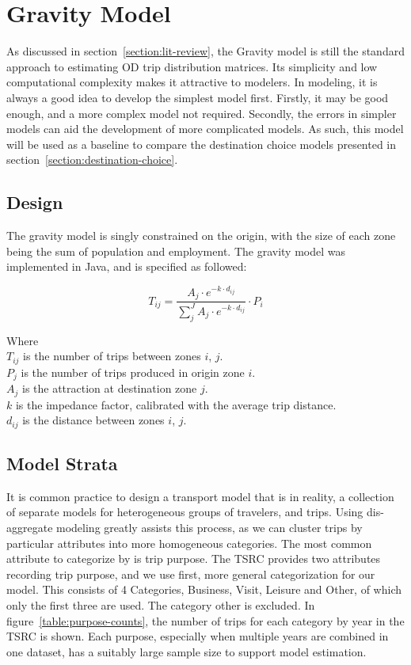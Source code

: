 \chapter{Gravity Model} 
\label{section:gravity-model}
As discussed in section~\ref{section:lit-review}, the Gravity model is still the standard approach to estimating OD trip distribution matrices. Its simplicity and low computational complexity makes it attractive to modelers. In modeling, it is always a good idea to develop the simplest model first. Firstly, it may be good enough, and a more complex model not required. Secondly, the errors in simpler models can aid the development of more complicated models. As such, this model will be used as a baseline to compare the destination choice models presented in section~\ref{section:destination-choice}.

\section{Design}
The gravity model is singly constrained on the origin, with the size of each zone being the sum of population and employment. The gravity model was implemented in Java, and is specified as followed:

$$ 
T_{ij} = \frac{A_j \cdot e^{-k \cdot d_{ij}}}{\sum_j^J A_j \cdot e^{-k \cdot d_{ij}}} \cdot P_i $$

Where \\
$T_{ij}$ is the number of trips between zones $i$, $j$. \\
$P_j$ is the number of trips produced in origin zone $i$.\\
$A_j$ is the attraction at destination zone $j$.\\
$k$ is the impedance factor, calibrated with the average trip distance.\\
$d_{ij}$ is the distance between zones $i$, $j$.\\

\section{Model Strata}
It is common practice to design a transport model that is in reality, a collection of separate models for heterogeneous groups of travelers, and trips. Using dis-aggregate modeling greatly assists this process, as we can cluster trips by particular attributes into more homogeneous categories. The most common attribute to categorize by is trip purpose. The TSRC provides two attributes recording trip purpose, and we use first, more general categorization for our model. This consists of 4 Categories, Business, Visit, Leisure and Other, of which only the first three are used. The category other is excluded. In figure~\ref{table:purpose-counts}, the number of trips for each category by year in the TSRC is shown. Each purpose, especially when multiple years are combined in one dataset, has a suitably large sample size to support model estimation. 

